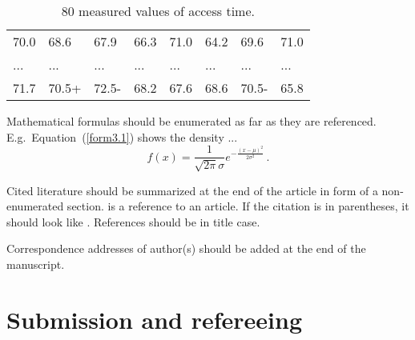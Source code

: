 \documentclass[article]{ajs}
\begin{document}
\begin{table}[hbt]
\caption{\label{Tab3.4}80 measured values of access time.}
\vspace*{-5mm}
\small
\hspace{1.5cm}
\begin{center}
\begin{tabular}{llllllll}
70.0 & 68.6 & 67.9 & 66.3 & 71.0 & 64.2 & 69.6 & 71.0\\
... & ... & ... & ... & ... & ... & ... & ...\\
71.7 & 70.5+& 72.5-& 68.2 & 67.6 & 68.6 & 70.5-& 65.8
\vspace*{-5mm}
\end{tabular}
\end{center}
\end{table}

Mathematical formulas should be enumerated as far as they are
referenced. E.g.~Equation~(\ref{form3.1}) shows the density ...
\begin{equation}\label{form3.1}
f(x) =
\frac1{\sqrt{2\pi}\sigma}e^{-\frac{(x-\mu)^2}{2\sigma^2}}\,.
\end{equation}

Cited literature should be summarized at the end of the article in
form of a non-enumerated section. \cite{leisch02} is a reference
to an article. If the citation is in parentheses, it
should look like \citep{leisch02}.
References should be in title case.

Correspondence addresses of author(s) should be added at the end
of the manuscript. 


\section{Submission and refereeing}
\end{document}
